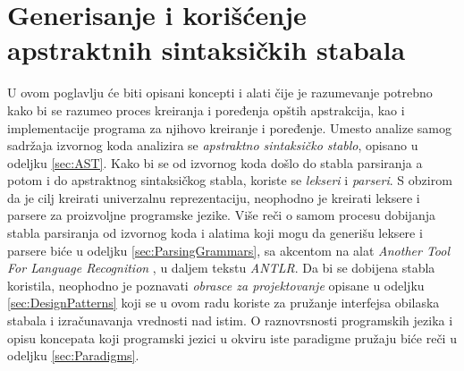 \chapter[Apstraktna sintaksnička stabla]{Generisanje i korišćenje apstraktnih sintaksičkih stabala}
\label{chp:RelevantTerms}

U ovom poglavlju će biti opisani koncepti i alati čije je razumevanje potrebno kako bi se razumeo proces kreiranja i poređenja opštih apstrakcija, kao i implementacije programa za njihovo kreiranje i poređenje. Umesto analize samog sadržaja izvornog koda analizira se \emph{apstraktno sintaksičko stablo}, opisano u odeljku \ref{sec:AST}. Kako bi se od izvornog koda došlo do stabla parsiranja a potom i do apstraktnog sintaksičkog stabla, koriste se \emph{lekseri} i \emph{parseri}. S obzirom da je cilj kreirati univerzalnu reprezentaciju, neophodno je kreirati leksere i parsere za proizvoljne programske jezike. Više reči o samom procesu dobijanja stabla parsiranja od izvornog koda i alatima koji mogu da generišu leksere i parsere biće u odeljku \ref{sec:ParsingGrammars}, sa akcentom na alat \emph{Another Tool For Language Recognition} \cite{ANTLR}, u daljem tekstu \emph{ANTLR}. Da bi se dobijena stabla koristila, neophodno je poznavati \emph{obrasce za projektovanje} opisane u odeljku \ref{sec:DesignPatterns} koji se u ovom radu koriste za pružanje interfejsa obilaska stabala i izračunavanja vrednosti nad istim. O raznovrsnosti programskih jezika i opisu koncepata koji programski jezici u okviru iste paradigme pružaju biće reči u odeljku \ref{sec:Paradigms}.





